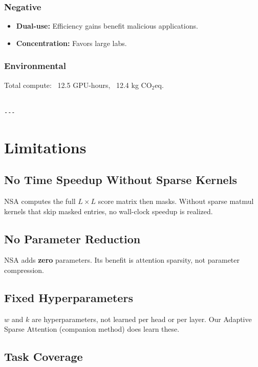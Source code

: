 \subsubsection{Negative}
\begin{itemize}
\item \textbf{Dual-use:} Efficiency gains benefit malicious applications.
\item \textbf{Concentration:} Favors large labs.

\end{itemize}
\subsubsection{Environmental}
Total compute: ~12.5 GPU-hours, ~12.4 kg CO$_2$eq.
\begin{lstlisting}

---
\end{lstlisting}


\section{Limitations}

\subsection{No Time Speedup Without Sparse Kernels}

NSA computes the full $L \times L$ score matrix then masks. Without sparse 
matmul kernels that skip masked entries, no wall-clock speedup is realized.

\subsection{No Parameter Reduction}

NSA adds \textbf{zero} parameters. Its benefit is attention sparsity, not 
parameter compression.

\subsection{Fixed Hyperparameters}

$w$ and $k$ are hyperparameters, not learned per head or per layer. Our 
Adaptive Sparse Attention (companion method) does learn these.

\subsection{Task Coverage}

